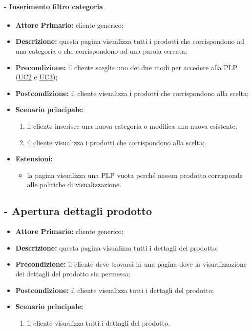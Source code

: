 \paragraph{ - Inserimento filtro categoria}
\begin{itemize}
    \item \textbf{Attore Primario:} cliente generico;
    \item \textbf{Descrizione:} questa pagina visualizza tutti i prodotti che corrispondono ad una categoria o che corrispondono ad una parola cercata;
    \item \textbf{Precondizione:} il cliente sceglie uno dei due modi per accedere alla PLP (\hyperref[UC2]{UC2} e \hyperref[UC3]{UC3});
    \item \textbf{Postcondizione:} il cliente visualizza i prodotti che corrispondono alla scelta;
    \item \textbf{Scenario principale:}
    \begin{enumerate}
        \item il cliente inserisce una nuova categoria o modifica una nuova esistente;
        \item il cliente visualizza i prodotti che corrispondono alla scelta;
    \end{enumerate}
    \item \textbf{Estensioni:}
    \begin{itemize}
        \item la pagina visualizza una PLP vuota perché nessun prodotto corrisponde alle politiche di visualizzazione.
    \end{itemize}
\end{itemize}

\stepUserCase
\subsection{ - Apertura dettagli prodotto}
\begin{itemize}
    \item \textbf{Attore Primario:} cliente generico;
    \item \textbf{Descrizione:} questa pagina visualizza tutti i dettagli del prodotto;
    \item \textbf{Precondizione:} il cliente deve trovarsi in una pagina dove la visualizzazione dei dettagli del prodotto sia permessa;
    \item \textbf{Postcondizione:} il cliente visualizza tutti i dettagli del prodotto;
    \item \textbf{Scenario principale:}
    \begin{enumerate}
        \item il cliente visualizza tutti i dettagli del prodotto.
    \end{enumerate}
\end{itemize}

